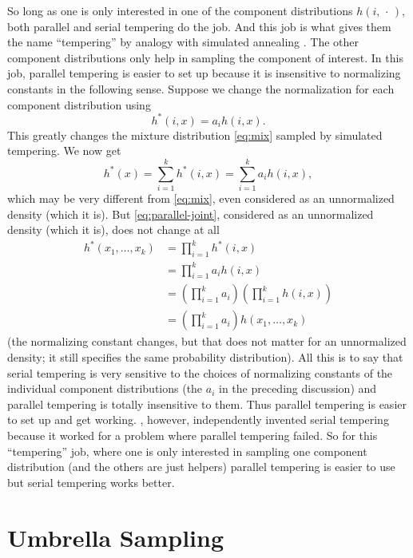 \documentclass[11pt]{article}
\newcommand{\fatdot}{\,\cdot\,}
\begin{document}
So long as one is only interested in one of the component distributions
$h(i, \fatdot)$, both parallel and serial tempering do the job.  And
this job is what gives them the name ``tempering'' by analogy with simulated
annealing \citep{marinari-parisi}.  The other component distributions only help
in sampling the component of interest.  In this job, parallel tempering is
easier to set up because it is insensitive to normalizing constants in the
following sense.  Suppose we change the normalization for each component
distribution using
$$
   h^*(i, x) = a_i h(i, x).
$$
This greatly changes the mixture distribution \eqref{eq:mix} sampled by
simulated tempering.  We now get
$$
   h^*(x) = \sum_{i = 1}^k h^*(i, x) = \sum_{i = 1}^k a_i h(i, x),
$$
which may be very different from \eqref{eq:mix}, even considered as an
unnormalized density (which it is).  But \eqref{eq:parallel-joint}, considered
as an unnormalized density (which it is), does not change at all
\begin{align*}
   h^*(x_1, \ldots, x_k)
   & =
   \prod_{i = 1}^k h^*(i, x)
   \\
   & =
   \prod_{i = 1}^k a_i h(i, x)
   \\
   & =
   \left( \prod_{i = 1}^k a_i \right)
   \left( \prod_{i = 1}^k h(i, x) \right)
   \\
   & =
   \left( \prod_{i = 1}^k a_i \right)
   h(x_1, \ldots, x_k)
\end{align*}
(the normalizing constant changes, but that does not matter for an unnormalized
density; it still specifies the same probability distribution).  All this is
to say that serial tempering is very sensitive to the choices of normalizing
constants of the individual component distributions (the $a_i$ in the preceding
discussion) and parallel tempering is totally insensitive to them.  Thus
parallel tempering is easier to set up and get working.
\citet{geyer-thompson}, however, independently invented serial tempering
because it worked for
a problem where parallel tempering failed.  So for this ``tempering'' job,
where one is only interested in sampling one component distribution (and the
others are just helpers) parallel tempering is easier to use but serial
tempering works better.

\section{Umbrella Sampling}
\end{document}
